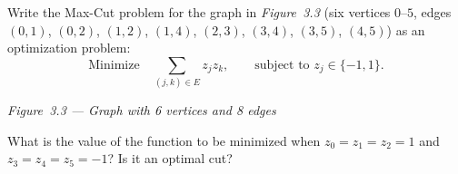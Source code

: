 \documentclass{ceri/sty/rapport}
\newcounter{exercice}[section]
\begin{document}
\begin{exercice}[p.~87]
Write the Max-Cut problem for the graph in \emph{Figure~3.3} (six vertices $0$--$5$,
edges $(0,1)$, $(0,2)$, $(1,2)$, $(1,4)$, $(2,3)$, $(3,4)$, $(3,5)$, $(4,5)$)
as an optimization problem:
\[
  \text{Minimize} \quad \sum_{(j,k)\in E} z_j z_k,
  \qquad \text{subject to } z_j \in \{-1, 1\}.
\]

\medskip
\begin{center}

\smallskip
{\small\textit{Figure~3.3 --- Graph with 6 vertices and 8 edges}}
\end{center}

What is the value of the function to be minimized when $z_0 = z_1 = z_2 = 1$ and $z_3 = z_4 = z_5 = -1$?
Is it an optimal cut?
\end{exercice}
\end{document}
